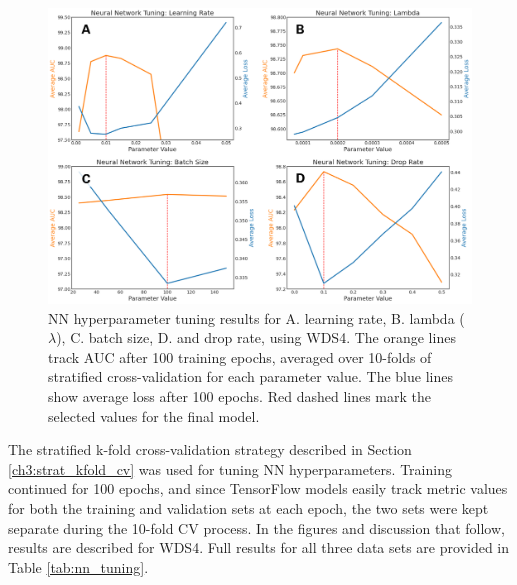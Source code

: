 \begin{figure}[htp]
\centering
\includegraphics[width=\textwidth]{templates/images/Figure-NN_Hyperparameters.png}
\caption[Neural network hyperparameter tuning]{NN hyperparameter tuning results for A. learning rate, B. lambda ($\lambda$), C. batch size, D. and drop rate, using WDS4. The orange lines track AUC after 100 training epochs, averaged over 10-folds of stratified cross-validation for each parameter value. The blue lines show average loss after 100 epochs. Red dashed lines mark the selected values for the final model.}
\label{fig:nn_tuning_plots}
\end{figure}

The stratified k-fold cross-validation strategy described in Section \ref{ch3:strat_kfold_cv} was used for tuning NN hyperparameters. Training continued for 100 epochs, and since TensorFlow models easily track metric values for both the training and validation sets at each epoch, the two sets were kept separate during the 10-fold CV process. In the figures and discussion that follow, results are described for WDS4. Full results for all three data sets are provided in Table \ref{tab:nn_tuning}. 

